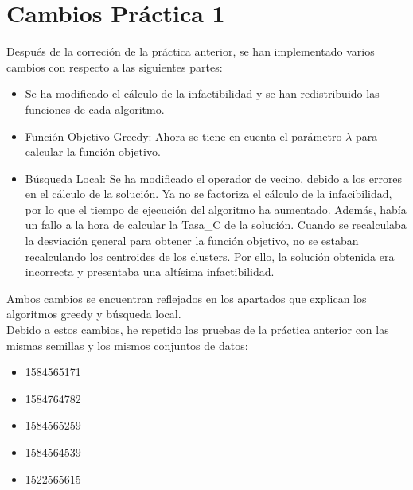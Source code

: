 \newpage
\section{Cambios Práctica 1}
Después de la correción de la práctica anterior, se han implementado varios cambios con respecto a las siguientes partes:

\begin{itemize}
   \item Se ha modificado el cálculo de la infactibilidad y se han redistribuido las funciones de cada algoritmo.
   \item Función Objetivo Greedy: Ahora se tiene en cuenta el parámetro $ \lambda $ para calcular la función objetivo.
   \item Búsqueda Local: Se ha modificado el operador de vecino, debido a los errores en el cálculo de la solución. Ya no se factoriza el cálculo de la infacibilidad, por lo que el tiempo de ejecución del algoritmo ha aumentado. Además, había un fallo a la hora de calcular la Tasa\_C de la solución. Cuando se recalculaba la desviación general para obtener la función objetivo, no se estaban recalculando los centroides de los clusters. Por ello, la solución obtenida era incorrecta y presentaba una altísima infactibilidad.
\end{itemize}
Ambos cambios se encuentran reflejados en los apartados que explican los algoritmos greedy y búsqueda local.\\
Debido a estos cambios, he repetido las pruebas de la práctica anterior con las mismas semillas y los mismos conjuntos de datos:
\begin{itemize}
   \item 1584565171
   \item 1584764782
   \item 1584565259
   \item 1584564539
   \item 1522565615
\end{itemize}

